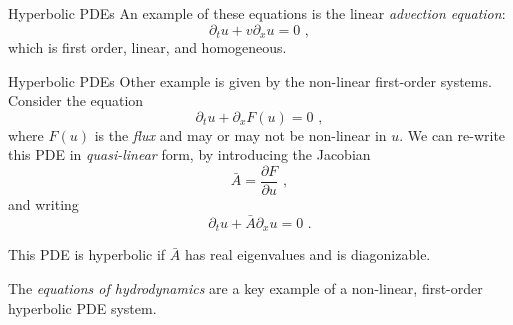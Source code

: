 \documentclass[11pt]{beamer}
\begin{document}
\begin{frame}[fragile]{Hyperbolic PDEs}
An example
of these equations is the linear \emph{advection equation}:
\begin{equation}
\partial_t u + v \partial_x u = 0\,\,,
\end{equation}
which is first order, linear, and homogeneous.
\end{frame}

\begin{frame}[fragile]{Hyperbolic PDEs}
Other example is given by the non-linear first-order systems. Consider the equation
\begin{equation}
\partial_t u + \partial_x F(u) = 0\,\,,
\end{equation}
where $F(u)$ is the \emph{flux} and may or may not be non-linear in $u$.
We can re-write this PDE in \emph{quasi-linear} form, by introducing
the Jacobian
\begin{equation}
\bar{A} = \frac{\partial F}{\partial u}\,\,,
\end{equation}
and writing
\begin{equation}
\partial_t u + \bar{A}\partial_x u = 0\,\,.
\label{eq:pde_quasilin1}
\end{equation}

This PDE is hyperbolic if $\bar{A}$ has real eigenvalues and is
diagonizable. \\
\bigskip

The \emph{equations of hydrodynamics} are a key example
of a non-linear, first-order hyperbolic PDE system.
\end{frame}

\end{document}
